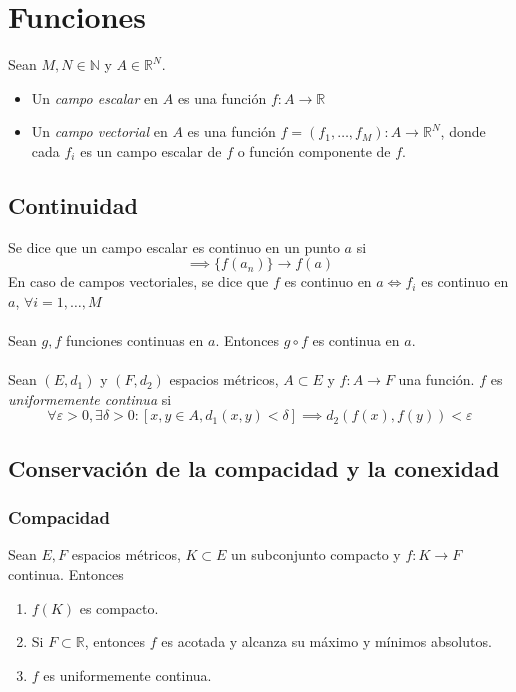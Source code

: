 \documentclass[11pt,titlepage,a4paper]{article}
\begin{document}
\section{Funciones}
Sean $M,N\in\mathbb{N}$ y $A\in\mathbb{R}^N$.
\begin{itemize}
\item Un \emph{campo escalar} en $A$ es una función $f:A\to\mathbb{R}$
\item Un \emph{campo vectorial} en $A$ es una función 
$f=(f_1,\dotsc,f_M):A\to\mathbb{R}^N$, donde cada $f_i$ es un campo escalar de $f$ o función componente de $f$.
\end{itemize}

\subsection{Continuidad}
Se dice que un campo escalar es continuo en un punto $a$ si
\begin{equation*}
[\forall a\in A,\{a_n\}\to a]\implies\{f(a_n)\}\to f(a)
\end{equation*}
En caso de campos vectoriales, se dice que $f$ es continuo en $a\iff f_i$ es continuo en $a$, $\forall i=1,\dotsc, M$\\\\
Sean $g,f$ funciones continuas en $a$. Entonces $g\circ f$ es continua en $a$.\\\\
Sean $(E,d_1)$ y $(F,d_2)$ espacios métricos, $A\subset E$ y $f:A\to F$ una función. $f$ es \emph{uniformemente continua} si
\begin{equation*}
\forall\varepsilon>0,\exists\delta>0:[x,y\in A,d_1(x,y)<\delta]\implies d_2(f(x),f(y))<\varepsilon
\end{equation*}

\subsection{Conservación de la compacidad y la conexidad}
\subsubsection*{Compacidad}
Sean $E,F$ espacios métricos, $K\subset E$ un subconjunto compacto y $f:K\to F$ continua. Entonces
\renewcommand{\theenumi}{\roman{enumi}}%
\begin{enumerate}
\item $f(K)$ es compacto.
\item Si $F\subset\mathbb{R}$, entonces $f$ es acotada y alcanza su máximo y mínimos absolutos.
\item $f$ es uniformemente continua.
\end{enumerate}
\end{document}
